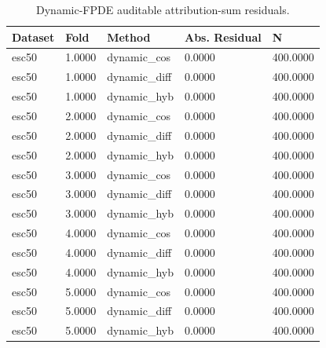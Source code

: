 \begin{table}[htbp]
\centering
\caption{Dynamic-FPDE auditable attribution-sum residuals.}
\label{tab:dynamic-fpde-additivity}
\begin{tabular}{lllll}
\toprule
Dataset & Fold & Method & Abs. Residual & N \\
\midrule
esc50 & 1.0000 & dynamic\_cos & 0.0000 & 400.0000 \\
esc50 & 1.0000 & dynamic\_diff & 0.0000 & 400.0000 \\
esc50 & 1.0000 & dynamic\_hyb & 0.0000 & 400.0000 \\
esc50 & 2.0000 & dynamic\_cos & 0.0000 & 400.0000 \\
esc50 & 2.0000 & dynamic\_diff & 0.0000 & 400.0000 \\
esc50 & 2.0000 & dynamic\_hyb & 0.0000 & 400.0000 \\
esc50 & 3.0000 & dynamic\_cos & 0.0000 & 400.0000 \\
esc50 & 3.0000 & dynamic\_diff & 0.0000 & 400.0000 \\
esc50 & 3.0000 & dynamic\_hyb & 0.0000 & 400.0000 \\
esc50 & 4.0000 & dynamic\_cos & 0.0000 & 400.0000 \\
esc50 & 4.0000 & dynamic\_diff & 0.0000 & 400.0000 \\
esc50 & 4.0000 & dynamic\_hyb & 0.0000 & 400.0000 \\
esc50 & 5.0000 & dynamic\_cos & 0.0000 & 400.0000 \\
esc50 & 5.0000 & dynamic\_diff & 0.0000 & 400.0000 \\
esc50 & 5.0000 & dynamic\_hyb & 0.0000 & 400.0000 \\
\bottomrule
\end{tabular}
\end{table}
